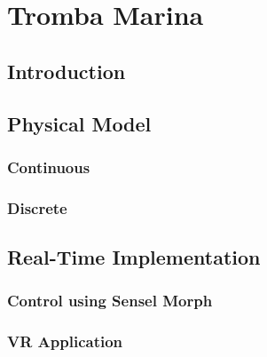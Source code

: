 \chapter{Tromba Marina}\label{ch:tromba}
\section{Introduction}

\section{Physical Model}
\subsection{Continuous}
\subsection{Discrete}

\section{Real-Time Implementation}

\subsection{Control using Sensel Morph}

\subsection{VR Application}
